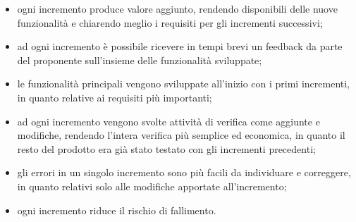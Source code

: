 \begin{itemize}
	\item ogni incremento produce valore aggiunto, rendendo disponibili delle nuove funzionalità e chiarendo meglio i requisiti per gli incrementi successivi;
	\item ad ogni incremento è possibile ricevere in tempi brevi un feedback da parte del proponente sull'insieme delle funzionalità sviluppate;
	\item le funzionalità principali vengono sviluppate all'inizio con i primi incrementi, in quanto relative ai requisiti più importanti;
	\item ad ogni incremento vengono svolte attività di verifica come aggiunte e modifiche, rendendo l'intera verifica più semplice ed economica, in quanto il resto del prodotto era già stato testato con gli incrementi precedenti;
	\item gli errori in un singolo incremento sono più facili da individuare e correggere, in quanto relativi solo alle modifiche apportate all'incremento;
	\item ogni incremento riduce il rischio di fallimento.
\end{itemize}